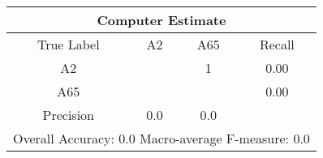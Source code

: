 \begin{tabular}{|c||c|c||c|}
\hline 
\multicolumn{4}{|c|}{Computer Estimate}\\
\hline 
True Label & A2 & A65 & Recall \\
\hline 
A2 &  &1 &  0.00\\
A65 &  & & 0.00\\
\hline 
Precision & 0.0 & 0.0 & \\
\hline 
\multicolumn{4}{|c|}{Overall Accuracy: 0.0 Macro-average F-measure: 0.0}\\
\hline 
\end{tabular} 
